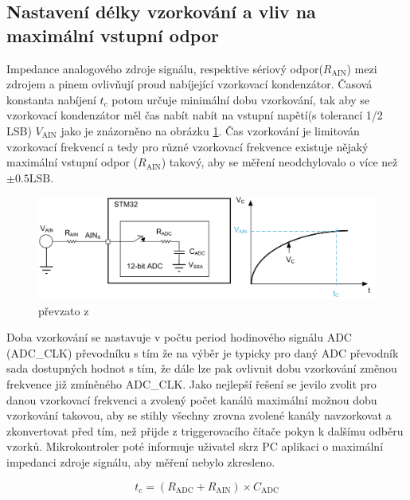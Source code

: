 \subsection{Nastavení délky vzorkování a vliv na maximální vstupní odpor}\label{Ch:SamplingTimeAndMaxInputRes}
Impedance analogového zdroje signálu, respektive sériový odpor($R_\text{AIN}$) mezi zdrojem a pinem ovlivňují proud nabíjející vzorkovací kondenzátor. Časová konstanta nabíjení $t_c$ potom určuje minimální dobu vzorkování, tak aby se vzorkovací kondenzátor měl čas nabít nabít na vstupní napětí(s tolerancí 1/2 LSB) $V_\text{AIN}$ jako je znázorněno na obrázku \ref{fig:samplingtimeandmaxinputresistance}. Čas vzorkování je limitován vzorkovací frekvencí a tedy pro různé vzorkovací frekvence existuje nějaký maximální vstupní odpor ($R_\text{AIN}$) takový, aby se měření neodchylovalo o více než $\pm0.5 \text{LSB}$.\\

\begin{figure}[H]
	\centering
	\includegraphics[width=0.9\linewidth]{Figs/Diagrams/SamplingTimeAndMaxInputResistance}
	\caption{ převzato z \cite{ADC_Acuraccy}}
	\label{fig:samplingtimeandmaxinputresistance}
\end{figure}

Doba vzorkování se nastavuje v počtu period hodinového signálu ADC (ADC\_CLK) převodníku s tím že na výběr je typicky pro daný ADC převodník sada dostupných hodnot s tím, že dále lze pak ovlivnit dobu vzorkování změnou frekvence již zmíněného ADC\_CLK. Jako nejlepší řešení se jevilo zvolit pro danou vzorkovací frekvenci a zvolený počet kanálů maximální možnou dobu vzorkování takovou, aby se stihly všechny zrovna zvolené kanály navzorkovat a zkonvertovat před tím, než přijde z triggerovacího čítače pokyn k dalšímu odběru vzorků. Mikrokontroler poté informuje uživatel skrz PC aplikaci o maximální impedanci zdroje signálu, aby měření nebylo zkresleno.

\begin{equation}
	t_c=(R_\text{ADC}+R_\text{AIN})\times C_\text{ADC}
\end{equation}

